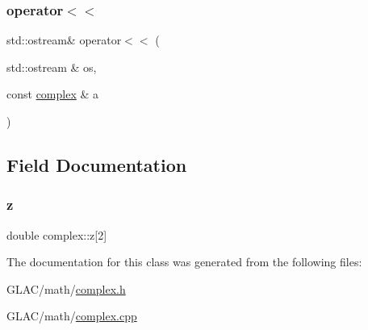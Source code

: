 \subsubsection{\texorpdfstring{operator$<$$<$}{operator<<}}
{\footnotesize\ttfamily std\+::ostream\& operator$<$$<$ (\begin{DoxyParamCaption}\item[{std\+::ostream \&}]{os,  }\item[{const \mbox{\hyperlink{classcomplex}{complex}} \&}]{a }\end{DoxyParamCaption})\hspace{0.3cm}{\ttfamily [friend]}}



\subsection{Field Documentation}
\mbox{\label{classcomplex_a24187dbb902b927fe283d138188ec6fe}} 
\subsubsection{\texorpdfstring{z}{z}}
{\footnotesize\ttfamily double complex\+::z\mbox{[}2\mbox{]}}



The documentation for this class was generated from the following files\+:\begin{DoxyCompactItemize}
\item 
G\+L\+A\+C/math/\mbox{\hyperlink{complex_8h}{complex.\+h}}\item 
G\+L\+A\+C/math/\mbox{\hyperlink{complex_8cpp}{complex.\+cpp}}\end{DoxyCompactItemize}
